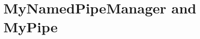 \section{MyNamedPipeManager and MyPipe}\label{appendix:pipeListings}

\enlargethispage{1cm}

      \setJavaCodeListing
      
\newpage
      \setJavaCodeListing
      
      
      \setJavaCodeListing
      
